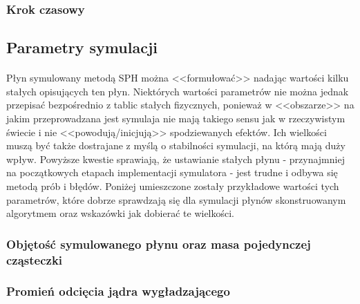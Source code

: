 \par

\subsubsection{Krok czasowy}

\paragraph{}

\par

\subsection{Parametry symulacji}

\paragraph{}
Płyn symulowany metodą SPH można <<formułować>> nadając wartości kilku stałych opisujących ten płyn. Niektórych wartości parametrów nie można jednak przepisać bezpośrednio z tablic stałych fizycznych, ponieważ w <<obszarze>> na jakim przeprowadzana jest symulaja nie mają takiego sensu jak w rzeczywistym świecie i nie <<powodują/inicjują>> spodziewanych efektów. Ich wielkości muszą być także dostrajane z myślą o stabilności symulacji, na którą mają duży wpływ. Powyższe kwestie sprawiają, że ustawianie stałych płynu - przynajmniej na początkowych etapach implementacji symulatora - jest trudne i odbywa się metodą prób i błędów. Poniżej umieszczone zostały przykładowe wartości tych parametrów, które dobrze sprawdzają się dla symulacji płynów skonstruowanym algorytmem oraz wskazówki jak dobierać te wielkości.
\par

\subsubsection{Objętość symulowanego płynu oraz masa pojedynczej cząsteczki}

\paragraph{}

\par

\subsubsection{Promień odcięcia jądra wygładzającego}

